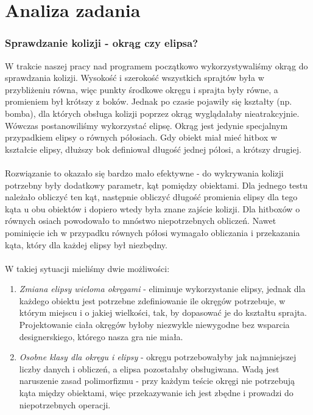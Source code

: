 \newpage
\part{\huge \textbf{Analiza zadania}}
	\section{Sprawdzanie kolizji - okrąg czy elipsa?}
		W trakcie naszej pracy nad programem początkowo wykorzystywaliśmy okrąg do sprawdzania kolizji. Wysokość i szerokość wszystkich sprajtów była w przybliżeniu równa, więc punkty środkowe okręgu i sprajta były równe, a promieniem był krótszy z boków. Jednak po czasie pojawiły się kształty (np. bomba), dla których obsługa kolizji poprzez okrąg wyglądałaby nieatrakcyjnie. Wówczas postanowiliśmy wykorzystać elipsę. Okrąg jest jedynie specjalnym przypadkiem elipsy o równych półosiach. Gdy obiekt miał mieć hitbox w kształcie elipsy, dłuższy bok definiował długość jednej półosi, a krótszy drugiej.\\\\
		Rozwiązanie to okazało się bardzo mało efektywne - do wykrywania kolizji potrzebny były dodatkowy parametr, kąt pomiędzy obiektami. Dla jednego testu należało obliczyć ten kąt, następnie obliczyć długość promienia elipsy dla tego kąta u obu obiektów i dopiero wtedy była znane zajście kolizji. Dla hitboxów o równych osiach powodowało to mnóstwo niepotrzebnych obliczeń. Nawet pominięcie ich w przypadku równych półosi wymagało obliczania i przekazania kąta, który dla każdej elipsy był niezbędny.\\\\
		W takiej sytuacji mieliśmy dwie możliwości:
		\begin{enumerate}
			\item \textit{Zmiana elipsy wieloma okręgami} - eliminuje wykorzystanie elipsy, jednak dla każdego obiektu jest potrzebne zdefiniowanie ile okręgów potrzebuje, w którym miejscu i o jakiej wielkości, tak, by dopasować je do kształtu sprajta. Projektowanie ciała okręgów byłoby niezwykle niewygodne bez wsparcia designerskiego, którego nasza gra nie miała. 
			\item \textit{Osobne klasy dla okręgu i elipsy} - okręgu potrzebowałyby jak najmniejszej liczby danych i obliczeń, a elipsa pozostałaby obsługiwana. Wadą jest naruszenie zasad polimorfizmu - przy każdym teście okręgi nie potrzebują kąta między obiektami, więc przekazywanie ich jest zbędne i prowadzi do niepotrzebnych operacji.
		\end{enumerate}
